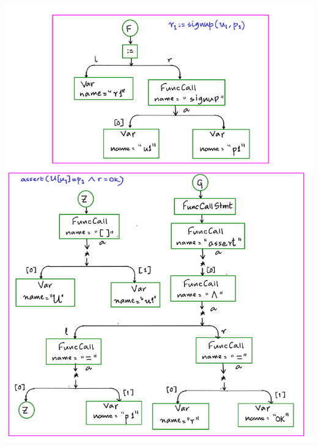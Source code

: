 \documentclass[12pts, a4paper]{article}
\begin{document}
\begin{center}
\includegraphics[width=\textwidth]{../images/ACT-AST-12.png}


\end{center}
\end{document}
